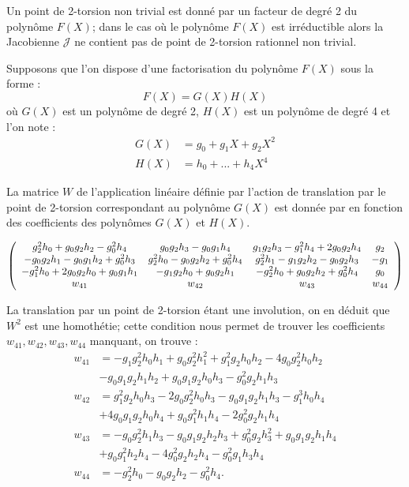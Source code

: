 \documentclass[a4paper]{article}
\theoremstyle{definition}
\theoremstyle{remark}
\numberwithin{equation}{section}
\begin{document}
Un point de 2-torsion non trivial est donné par un facteur de degré 2 du polynôme $F(X)$; dans le cas où le polynôme $F(X)$ est irréductible alors la Jacobienne $\mathcal{J}$ ne contient pas de point de 2-torsion rationnel non trivial.

Supposons que l'on dispose d'une factorisation du polynôme $F(X)$ sous la forme :
$$F(X) = G(X)H(X)$$
où $G(X)$ est un polynôme de degré 2, $H(X)$ est un polynôme de degré 4 et l'on note :
\begin{align*}
G(X) &= g_0 + g_1X + g_2X^2 \\
H(X) &= h_0 + ... + h_4X^4
\end{align*}

La matrice $W$ de l'application linéaire définie par l'action de translation par le point de 2-torsion correspondant au polynôme $G(X)$ est donnée par \citet{eqKum} en fonction des coefficients des polynômes $G(X)$ et $H(X)$.

\[ \left(
  \begin{array}{ c c c c}
     g_2^2h_0 + g_0g_2h_2 - g_0^2h_4 & g_0g_2h_3 - g_0g_1h_4 & g_1g_2h_3 - g_1^2h_4 + 2g_0g_2h_4  & g_2  \\
     -g_0g_2h_1 - g_0g_1h_2 + g_0^2h_3 & g_2^2h_0 - g_0g_2h_2 + g_0^2h_4  & g_2^2h_1 - g_1g_2h_2 - g_0g_2h_3  & -g_1  \\
     -g_1^2h_0 + 2g_0g_2h_0 + g_0g_1h_1 & -g_1g_2h_0 + g_0g_2h_1  & -g_2^2h_0 + g_0g_2h_2 + g_0^2h_4  & g_0 \\
     w_{41} & w_{42}   & w_{43}  & w_{44}  \\
  \end{array} \right)
\]

La translation par un point de 2-torsion étant une involution, on en déduit que $W^2$ est une homothétie; cette condition nous permet de trouver les coefficients $w_{41},w_{42} ,w_{43},w_{44}$ manquant, on trouve :
\begin{align*}
w_{41} &= -g_1g_2^2h_0h_1 + g_0g_2^2h_1^2 + g_1^2g_2h_0h_2 - 4g_0g_2^2h_0h_2 \\
	   &   -g_0g_1g_2h_1h_2 + g_0g_1g_2h_0h_3 - g_0^2g_2h_1h_3      \\
w_{42} &= g_1^2g_2h_0h_3 - 2g_0g_2^2h_0h_3 - g_0g_1g_2h_1h_3 - g_1^3h_0h_4 \\
	   &+ 4g_0g_1g_2h_0h_4 + g_0g_1^2h_1h_4 - 2g_0^2g_2h_1h_4     \\
w_{43} &= -g_0g_2^2h_1h_3 - g_0g_1g_2h_2h_3 + g_0^2g_2h_3^2 + g_0g_1g_2h_1h_4 \\
	   & + g_0g_1^2h_2h_4 - 4g_0^2g_2h_2h_4 - g_0^2g_1h_3h_4        \\        
w_{44} &= -g_2^2h_0 - g_0g_2h_2 - g_0^2h_4.
\end{align*}
\end{document}
